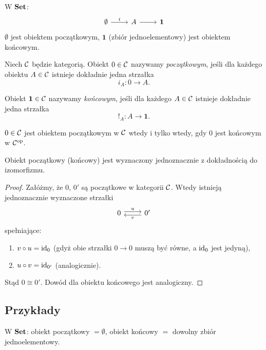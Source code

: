 W $\mathbf{Set}$:
\[
\begin{tikzcd}
\emptyset \arrow[r, "i"] & A \arrow[r] & \mathbf{1}
\end{tikzcd}
\]
$\emptyset$ jest obiektem początkowym, $\mathbf{1}$ (zbiór jednoelementowy) jest obiektem końcowym.

\begin{definicja}
Niech $\mathcal{C}$ będzie kategorią. Obiekt $0\in\mathcal{C}$ nazywamy \emph{początkowym}, jeśli dla każdego obiektu $A\in\mathcal{C}$ istnieje dokładnie jedna strzałka
\[
i_A\colon 0 \longrightarrow A.
\]
\end{definicja}

\begin{definicja}
Obiekt $\mathbf{1}\in\mathcal{C}$ nazywamy \emph{końcowym}, jeśli dla każdego $A\in\mathcal{C}$ istnieje dokładnie jedna strzałka
\[
!_A\colon A \longrightarrow \mathbf{1}.
\]
\end{definicja}

\begin{uwaga}
$0\in\mathcal{C}$ jest obiektem początkowym w $\mathcal{C}$ wtedy i tylko wtedy, gdy $0$ jest końcowym w $\mathcal{C}^{\mathrm{op}}$.
\end{uwaga}

\begin{stwierdzenie}
Obiekt początkowy (końcowy) jest wyznaczony jednoznacznie z dokładnością do izomorfizmu.
\end{stwierdzenie}

\begin{proof}
Załóżmy, że $0$, $0'$ są początkowe w kategorii $\mathcal{C}$. Wtedy istnieją jednoznacznie wyznaczone strzałki
\[
\begin{tikzcd}
0 \arrow[r, shift left, "u"] & 0' \arrow[l, shift left, "v"]
\end{tikzcd}
\]
spełniające:
\begin{enumerate}
\item $v\circ u = \mathrm{id}_0$ (gdyż obie strzałki $0\to 0$ muszą być równe, a $\mathrm{id}_0$ jest jedyną),
\item $u\circ v = \mathrm{id}_{0'}$ (analogicznie).
\end{enumerate}
Stąd $0\cong 0'$. Dowód dla obiektu końcowego jest analogiczny.
\end{proof}

\subsection{Przykłady}

\begin{przyklad}
W $\mathbf{Set}$: obiekt początkowy $=\emptyset$, obiekt końcowy $=$ dowolny zbiór jednoelementowy.
\end{przyklad}

